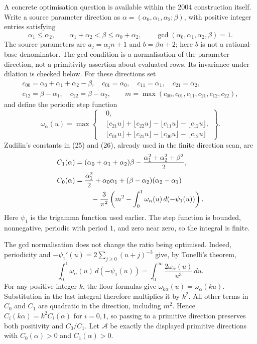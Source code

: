 \documentclass[11pt]{article}
\begin{document}
A concrete optimisation question is available within the 2004
construction itself. Write a source parameter direction as
$\alpha=(\alpha_0,\alpha_1,\alpha_2;\beta)$, with positive integer entries satisfying
\[
 \alpha_1\le\alpha_2,\qquad
 \alpha_1+\alpha_2<\beta\le\alpha_0+\alpha_2,\qquad
 \gcd(\alpha_0,\alpha_1,\alpha_2,\beta)=1.
\]
The source parameters are $a_j=\alpha_jn+1$ and $b=\beta n+2$;
here $b$ is not a rational-base denominator. The gcd condition is a
normalisation of the parameter direction, not a primitivity assertion
about evaluated rows. Its invariance under dilation is checked below.
For these directions set
\[
 \begin{gathered}
 c_{00}=\alpha_0+\alpha_1+\alpha_2-\beta,\quad
 c_{01}=\alpha_0,\quad c_{11}=\alpha_1,\quad c_{21}=\alpha_2,\\
 c_{12}=\beta-\alpha_1,\quad c_{22}=\beta-\alpha_2,\qquad
 m=\max(c_{00},c_{01},c_{11},c_{21},c_{12},c_{22}),
 \end{gathered}
\]
and define the periodic step function
\[
 \omega_\alpha(u)=\max\left\{\begin{aligned}
 &0,\\[-2pt]
 &\lfloor c_{21}u\rfloor+\lfloor c_{22}u\rfloor
       -\lfloor c_{11}u\rfloor-\lfloor c_{12}u\rfloor,\\[-2pt]
 &\lfloor c_{01}u\rfloor+\lfloor c_{21}u\rfloor
       -\lfloor c_{00}u\rfloor-\lfloor c_{12}u\rfloor
 \end{aligned}\right\}.
\]
Zudilin's constants in (25) and (26), already used in the finite
direction scan, are
\[
 \begin{aligned}
 C_1(\alpha)&=(\alpha_0+\alpha_1+\alpha_2)\beta
               -\frac{\alpha_1^2+\alpha_2^2+\beta^2}{2},\\
 C_0(\alpha)&=\frac{\alpha_1^2}{2}+\alpha_0\alpha_1
            +(\beta-\alpha_2)(\alpha_2-\alpha_1)\\
 &\hspace{8mm}-\frac3{\pi^2}
       \left(m^2-\int_0^1\omega_\alpha(u)\,d(-\psi_1(u))\right).
 \end{aligned}
\]
Here $\psi_1$ is the trigamma function used earlier. The step function
is bounded, nonnegative, periodic with period $1$, and zero near zero,
so the integral is finite.

The gcd normalisation does not change the ratio being optimised.
Indeed, periodicity and
$-\psi_1'(u)=2\sum_{j\ge0}(u+j)^{-3}$ give, by Tonelli's theorem,
\[
 \int_0^1\omega_\alpha(u)\,d(-\psi_1(u))
   =\int_0^\infty\frac{2\omega_\alpha(u)}{u^3}\,du.
\]
For any positive integer $k$, the floor formulas give
$\omega_{k\alpha}(u)=\omega_\alpha(ku)$. Substitution in the last integral
therefore multiplies it by $k^2$. All other terms in $C_0$ and $C_1$
are quadratic in the direction, including $m^2$. Hence
$C_i(k\alpha)=k^2C_i(\alpha)$ for $i=0,1$, so passing to a primitive
direction preserves both positivity and $C_0/C_1$.
Let $\mathcal A$ be exactly the displayed primitive directions with
$C_0(\alpha)>0$ and $C_1(\alpha)>0$.
\end{document}
